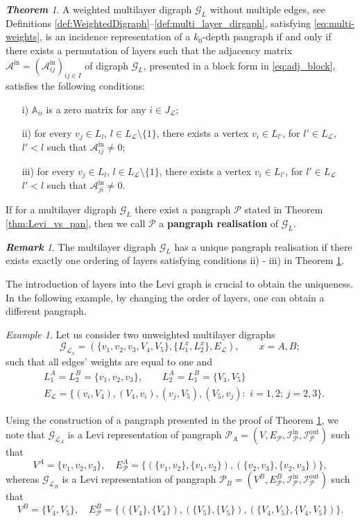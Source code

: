 \documentclass[a4paper,12pt]{article}
\theoremstyle{definition}
\theoremstyle{remark}
\newtheorem{exam}{Example}
\newcommand{\mG}{\mathcal{G}}
\newcommand{\mP}{\mathcal{P}}
\newcommand{\mL}{\mathcal{L}}
\newcommand{\EP}{E_{\mathcal{P}}}
\newcommand{\tin}{\mathrm{in}}
\newcommand{\out}{\mathrm{out}}
\newcommand{\incip}{\mathcal{I}^{\tin}_{\mP}}
\newcommand{\incop}{\mathcal{I}^{\out}_{\mP}}
\newtheorem{thm}{\small\bf Theorem}
\newtheorem{rem}{\small\bf Remark}
\begin{document}
\begin{thm}\label{thm:Levi_vs_pan}
A weighted multilayer digraph $\mG_L$ without multiple edges, see Definitions \ref{def:WeightedDigraph}--\ref{def:multi_layer_dirgaph}, satisfying \eqref{eq:multi-weights}, is an incidence representation of a $k_0$-depth pangraph if and only if there exists a permutation of layers such that the adjacency matrix $\mathcal{A}^{\tin}=(\mathcal{A}^{\tin}_{ij})_{ij\in I}$ of digraph $\mG_L$, presented in a block form in \eqref{eq:adj_block}, satisfies the following conditions:
\begin{itemize}

\item[i)] $\mathbb{A}_{ii}$ is a zero matrix for any $i\in J_{\mL}$;
\item[ii)] for every $v_j\in L_l$, $l\in L_{\mL}\setminus \{1\}$, there exists a vertex $v_i\in L_{l'}$, for $l'\in L_{\mL}$, $l'<l$ such that $\mathcal{A}_{ij}^{\tin}\neq 0;$
\item[iii)] for every $v_j\in L_l$, $l\in L_{\mL}\setminus \{1\}$, there exists a vertex $v_i\in L_{l'}$, for $l'\in L_{\mL}$ $l'<l$ such that $\mathcal{A}_{ji}^{\tin}\neq 0.$
\end{itemize}  
\end{thm}

If for a multilayer digraph $\mathcal{G}_L$ there exist a pangraph $\mP$ stated in Theorem \eqref{thm:Levi_vs_pan}, then we call $\mP$ a \textbf{pangraph realisation} of $\mathcal{G}_L$.
\begin{rem}\label{rem:uniq_pan}
The multilayer digraph $\mathcal{G}_L$ has a unique pangraph realisation if there exists exactly one ordering of layers satisfying conditions ii) - iii) in Theorem \ref{thm:Levi_vs_pan}.
\end{rem}

The introduction of layers into the Levi graph is crucial to obtain the uniqueness. In the following example, by changing the order of layers, one can obtain a different pangraph. 

\begin{exam}\label{exam:Levi_to_pan}
Let us consider two unweighted multilayer digraphs $$\mathcal{G}_{\mathcal{L}_x}=\left(\{v_1,v_2,v_3,V_4,V_5\}, \{L^x_1,L^x_2\}, E_{\mathcal{L}}\right),\qquad x=A,B;$$
such that all edges' weights are equal to one and 
\begin{eqnarray*}
&L^A_1=L^B_2=\{v_1,v_2,v_3\},\qquad L^A_2=L^B_1=\{V_4,V_5\}\\
&E_{\mathcal{L}}=\{(v_i,V_4),(V_4,v_i),(v_j,V_5),(V_5,v_j):\,\, i=1,2;\, j=2,3\}.
\end{eqnarray*}

Using the construction of a pangraph presented in the proof of Theorem \ref{thm:Levi_vs_pan}, we note that  $\mathcal{G}_{\mathcal{L}_A}$ is a Levi representation of pangraph $\mP_A=(V, \EP,\incip,\incop) $ such that
$$V^A=\{v_1,v_2,v_3\}, \quad \EP^A=\{(\{v_1,v_2\},\{v_1,v_2\}), (\{v_2,v_3\},\{v_2,v_3\})\},$$
whereas  $\mathcal{G}_{\mathcal{L}_B}$ is a Levi representation of pangraph $\mP_B=(V^B, \EP^B,\incip,\incop)$ such that 
$$V^B=\{V_4,V_5\}, \quad \EP^B=\{(\{V_4\},\{V_4\}), (\{V_5\},\{V_5\}), (\{V_4,V_5\},\{V_4,V_5\})\}.$$
\end{exam}
\end{document}
